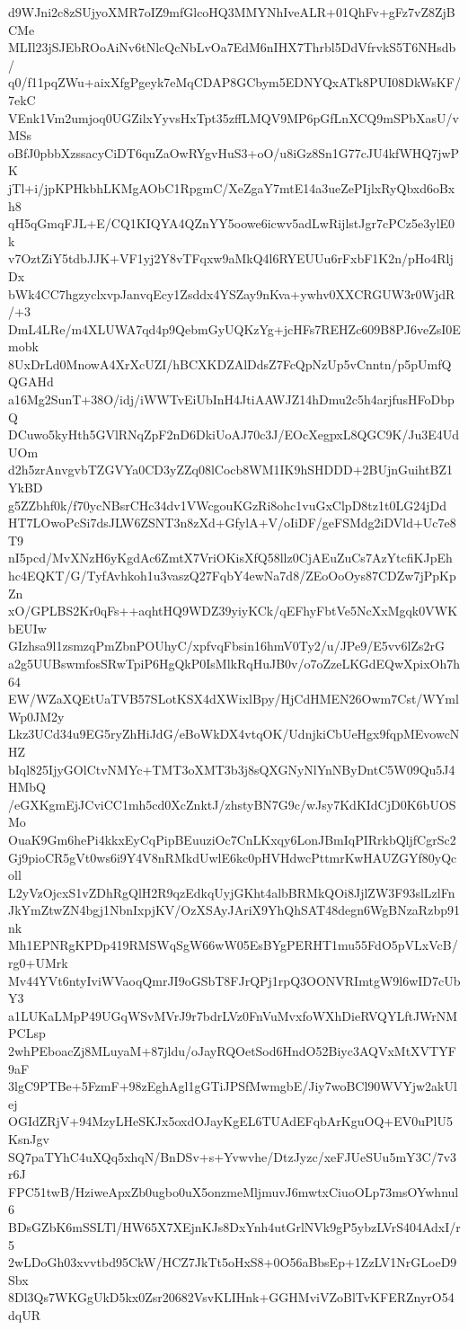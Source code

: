 d9WJni2c8zSUjyoXMR7oIZ9mfGlcoHQ3MMYNhIveALR+01QhFv+gFz7vZ8ZjBCMe
MLIl23jSJEbROoAiNv6tNlcQcNbLvOa7EdM6nIHX7Thrbl5DdVfrvkS5T6NHsdb/
q0/f11pqZWu+aixXfgPgeyk7eMqCDAP8GCbym5EDNYQxATk8PUI08DkWsKF/7ekC
VEnk1Vm2umjoq0UGZilxYyvsHxTpt35zffLMQV9MP6pGfLnXCQ9mSPbXasU/vMSs
oBfJ0pbbXzssacyCiDT6quZaOwRYgvHuS3+oO/u8iGz8Sn1G77cJU4kfWHQ7jwPK
jTl+i/jpKPHkbhLKMgAObC1RpgmC/XeZgaY7mtE14a3ueZePIjlxRyQbxd6oBxh8
qH5qGmqFJL+E/CQ1KIQYA4QZnYY5oowe6icwv5adLwRijlstJgr7cPCz5e3ylE0k
v7OztZiY5tdbJJK+VF1yj2Y8vTFqxw9aMkQ4l6RYEUUu6rFxbF1K2n/pHo4RljDx
bWk4CC7hgzyclxvpJanvqEcy1Zsddx4YSZay9nKva+ywhv0XXCRGUW3r0WjdR/+3
DmL4LRe/m4XLUWA7qd4p9QebmGyUQKzYg+jcHFs7REHZc609B8PJ6veZsI0Emobk
8UxDrLd0MnowA4XrXcUZI/hBCXKDZAlDdsZ7FcQpNzUp5vCnntn/p5pUmfQQGAHd
a16Mg2SunT+38O/idj/iWWTvEiUbInH4JtiAAWJZ14hDmu2c5h4arjfusHFoDbpQ
DCuwo5kyHth5GVlRNqZpF2nD6DkiUoAJ70c3J/EOcXegpxL8QGC9K/Ju3E4UdUOm
d2h5zrAnvgvbTZGVYa0CD3yZZq08lCocb8WM1IK9hSHDDD+2BUjnGuihtBZ1YkBD
g5ZZbhf0k/f70ycNBsrCHc34dv1VWcgouKGzRi8ohc1vuGxClpD8tz1t0LG24jDd
HT7LOwoPcSi7dsJLW6ZSNT3n8zXd+GfylA+V/oIiDF/geFSMdg2iDVld+Uc7e8T9
nI5pcd/MvXNzH6yKgdAc6ZmtX7VriOKisXfQ58llz0CjAEuZuCs7AzYtcfiKJpEh
hc4EQKT/G/TyfAvhkoh1u3vaszQ27FqbY4ewNa7d8/ZEoOoOys87CDZw7jPpKpZn
xO/GPLBS2Kr0qFs++aqhtHQ9WDZ39yiyKCk/qEFhyFbtVe5NcXxMgqk0VWKbEUIw
GIzhsa9l1zsmzqPmZbnPOUhyC/xpfvqFbsin16hmV0Ty2/u/JPe9/E5vv6lZs2rG
a2g5UUBswmfosSRwTpiP6HgQkP0IsMlkRqHuJB0v/o7oZzeLKGdEQwXpixOh7h64
EW/WZaXQEtUaTVB57SLotKSX4dXWixlBpy/HjCdHMEN26Owm7Cst/WYmlWp0JM2y
Lkz3UCd34u9EG5ryZhHiJdG/eBoWkDX4vtqOK/UdnjkiCbUeHgx9fqpMEvowcNHZ
bIql825IjyGOlCtvNMYc+TMT3oXMT3b3j8sQXGNyNlYnNByDntC5W09Qu5J4HMbQ
/eGXKgmEjJCviCC1mh5cd0XcZnktJ/zhstyBN7G9c/wJsy7KdKIdCjD0K6bUOSMo
OuaK9Gm6hePi4kkxEyCqPipBEuuziOc7CnLKxqy6LonJBmIqPIRrkbQljfCgrSc2
Gj9pioCR5gVt0ws6i9Y4V8nRMkdUwlE6kc0pHVHdwcPttmrKwHAUZGYf80yQcoll
L2yVzOjcxS1vZDhRgQlH2R9qzEdkqUyjGKht4albBRMkQOi8JjlZW3F93slLzlFn
JkYmZtwZN4bgj1NbnIxpjKV/OzXSAyJAriX9YhQhSAT48degn6WgBNzaRzbp91nk
Mh1EPNRgKPDp419RMSWqSgW66wW05EsBYgPERHT1mu55FdO5pVLxVcB/rg0+UMrk
Mv44YVt6ntyIviWVaoqQmrJI9oGSbT8FJrQPj1rpQ3OONVRImtgW9l6wID7cUbY3
a1LUKaLMpP49UGqWSvMVrJ9r7bdrLVz0FnVuMvxfoWXhDieRVQYLftJWrNMPCLsp
2whPEboacZj8MLuyaM+87jldu/oJayRQOetSod6HndO52Biyc3AQVxMtXVTYF9aF
3lgC9PTBe+5FzmF+98zEghAgl1gGTiJPSfMwmgbE/Jiy7woBCl90WVYjw2akUlej
OGIdZRjV+94MzyLHeSKJx5oxdOJayKgEL6TUAdEFqbArKguOQ+EV0uPlU5KsnJgv
SQ7paTYhC4uXQq5xhqN/BnDSv+s+Yvwvhe/DtzJyzc/xeFJUeSUu5mY3C/7v3r6J
FPC51twB/HziweApxZb0ugbo0uX5onzmeMljmuvJ6mwtxCiuoOLp73msOYwhnul6
BDsGZbK6mSSLTl/HW65X7XEjnKJs8DxYnh4utGrlNVk9gP5ybzLVrS404AdxI/r5
2wLDoGh03xvvtbd95CkW/HCZ7JkTt5oHxS8+0O56aBbsEp+1ZzLV1NrGLoeD9Sbx
8Dl3Qs7WKGgUkD5kx0Zsr20682VsvKLIHnk+GGHMviVZoBlTvKFERZnyrO54dqUR
